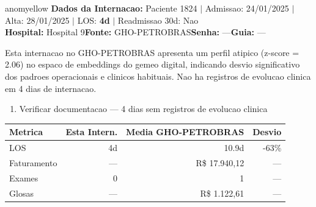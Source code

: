 \documentclass[a4paper,10pt]{article}
\begin{document}
\begin{anomalycard}[Internacao 119547 | GHO-PETROBRAS | MODERADO (z=2.06)]{anomyellow}
\textbf{Dados da Internacao:} Paciente 1824 $\mid$ Admissao: 24/01/2025 $\mid$ Alta: 28/01/2025 $\mid$ LOS: \textbf{4d} $\mid$ Readmissao 30d: Nao\\
\textbf{Hospital:} Hospital 9\quad\textbf{Fonte:} GHO-PETROBRAS\quad\textbf{Senha:} ---\quad\textbf{Guia:} ---\\
\vspace{2pt}\begin{tcolorbox}[colback=severityred!20,colframe=anomyellow,title={\textbf{Interpretacao de Negocio}},fonttitle=\bfseries\small,left=4pt,right=4pt,top=3pt,bottom=3pt]
{\small Esta internacao no GHO-PETROBRAS apresenta um perfil atipico (z-score = 2.06) no espaco de embeddings do gemeo digital, indicando desvio significativo dos padroes operacionais e clinicos habituais. Nao ha registros de evolucao clinica em 4 dias de internacao.}
\end{tcolorbox}
\begin{tcolorbox}[colback=severityyellow!30,colframe=anomorange,title={\textbf{Recomendacoes Especificas}},fonttitle=\bfseries\small,left=4pt,right=4pt,top=3pt,bottom=3pt]
\begin{enumerate}[nosep,leftmargin=16pt]
\item {\small Verificar documentacao --- 4 dias sem registros de evolucao clinica}
\end{enumerate}
\end{tcolorbox}
\begin{center}\begin{tabular}{l r r r}\toprule\textbf{Metrica} & \textbf{Esta Intern.} & \textbf{Media GHO-PETROBRAS} & \textbf{Desvio} \\\midrule
LOS & 4d & 10.9d & -63\% \\
Faturamento & --- & R\$ 17.940,12 & --- \\
Exames & 0 & 1 & --- \\
Glosas & --- & R\$ 1.122,61 & --- \\
\bottomrule\end{tabular}\end{center}


\end{anomalycard}
\end{document}
